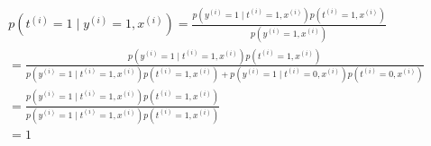\begin{answer}
\begin{eqnarray*}
p(t^{(i)}=1\mid y^{(i)} = 1, x^{(i)}) =\frac{p(y^{(i)} = 1\mid t^{(i)}=1, x^{(i)})p(t^{(i)}=1, x^{(i)})}{p(y^{(i)} = 1, x^{(i)})}\\
=\frac{p(y^{(i)} = 1\mid t^{(i)}=1, x^{(i)})p(t^{(i)}=1, x^{(i)})}{p(y^{(i)} = 1\mid t^{(i)}=1, x^{(i)})p(t^{(i)}=1, x^{(i)})+p(y^{(i)} = 1\mid t^{(i)}=0, x^{(i)})p(t^{(i)}=0, x^{(i)})}\\
=\frac{p(y^{(i)} = 1\mid t^{(i)}=1, x^{(i)})p(t^{(i)}=1, x^{(i)})}{p(y^{(i)} = 1\mid t^{(i)}=1, x^{(i)})p(t^{(i)}=1, x^{(i)})}\\
=1
\end{eqnarray*}
\end{answer}

